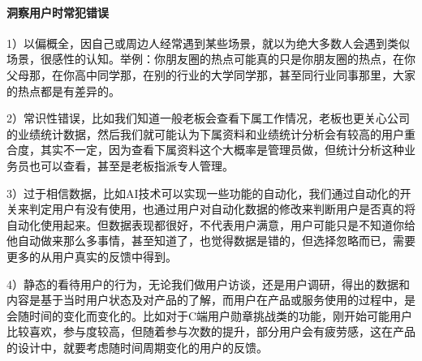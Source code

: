 \documentclass[letterpaper,11pt,english]{sphinxmanual}
\begin{document}
\paragraph{洞察用户时常犯错误}
\label{\detokenize{chapter_knowledge/users_analysis:id27}}
1）以偏概全，因自己或周边人经常遇到某些场景，就以为绝大多数人会遇到类似场景，很感性的认知。举例：你朋友圈的热点可能真的只是你朋友圈的热点，在你父母那，在你高中同学那，在别的行业的大学同学那，甚至同行业同事那里，大家的热点都是有差异的。

2）常识性错误，比如我们知道一般老板会查看下属工作情况，老板也更关心公司的业绩统计数据，然后我们就可能认为下属资料和业绩统计分析会有较高的用户重合度，其实不一定，因为查看下属资料这个大概率是管理员做，但统计分析这种业务员也可以查看，甚至是老板指派专人管理。

3）过于相信数据，比如AI技术可以实现一些功能的自动化，我们通过自动化的开关来判定用户有没有使用，也通过用户对自动化数据的修改来判断用户是否真的将自动化使用起来。但数据表现都很好，不代表用户满意，用户可能只是不知道你给他自动做来那么多事情，甚至知道了，也觉得数据是错的，但选择忽略而已，需要更多的从用户真实的反馈中得到。

4）静态的看待用户的行为，无论我们做用户访谈，还是用户调研，得出的数据和内容是基于当时用户状态及对产品的了解，而用户在产品或服务使用的过程中，是会随时间的变化而变化的。比如对于C端用户勋章挑战类的功能，刚开始可能用户比较喜欢，参与度较高，但随着参与次数的提升，部分用户会有疲劳感，这在产品的设计中，就要考虑随时间周期变化的用户的反馈。
\end{document}
